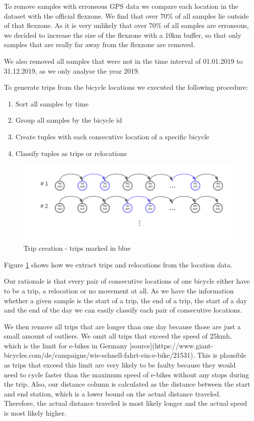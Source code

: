 To remove samples with erroneous GPS data we compare each location in the dataset with the official flexzone.
We find that over \(70\%\) of all samples lie outside of that flexzone.
As it is very unlikely that over 70\% of all samples are erroneous, we decided to increase the size of the flexzone with a 10km buffer, so that only samples that are really far away from the flexzone are removed.

We also removed all samples that were not in the time interval of 01.01.2019 to 31.12.2019, as we only analyse the year 2019.

To generate trips from the bicycle locations we executed the following procedure:
\begin{enumerate}
    \item Sort all samples by time
    \item Group all samples by the bicycle id
    \item Create tuples with each consecutive location of a specific bicycle
    \item Classify tuples as trips or relocations
\end{enumerate}


\begin{figure}[htp]
    \centering
    \includegraphics{Figures/trip_creation_diagram.pdf}
    \caption{Trip creation - trips marked in blue}
    \label{fig:trip_creation}
\end{figure}

Figure \ref{fig:trip_creation} shows how we extract trips and relocations from the location data.

Our rationale is that every pair of consecutive locations of one bicycle either have to be a trip, a relocation or no movement at all.
As we have the information whether a given sample is the start of a trip, the end of a trip, the start of a day and the end of the day we can easily classify each pair of consecutive locations.


We then remove all trips that are longer than one day because those are just a small amount of outliers.
We omit all trips that exceed the speed of 25kmh, which is the limit for e-bikes in Germany [source](https://www.giant-bicycles.com/de/campaigns/wie-schnell-fahrt-ein-e-bike/21531).
This is plausible as trips that exceed this limit are very likely to be faulty because they would need to cycle faster than the maximum speed of e-bikes without any stops during the trip.
Also, our distance column is calculated as the distance between the start and end station, which is a lower bound on the actual distance traveled.
Therefore, the actual distance traveled is most likely longer and the actual speed is most likely higher.

